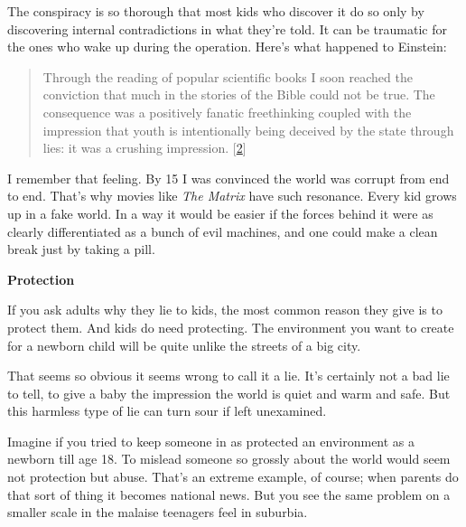 The conspiracy
                  is so thorough that most kids who discover it do so only by
                  discovering internal contradictions in what they're told. It
                  can be traumatic for the ones who wake up during the
                  operation. Here's what happened to Einstein:
                  \begin{quote}

                    Through the reading of popular scientific books I soon
                    reached the conviction that much in the stories of the Bible
                    could not be true. The consequence was a positively fanatic
                    freethinking coupled with the impression that youth is
                    intentionally being deceived by the state through lies: it
                    was a crushing impression.
                    [\href{\#f2n}{2}]
                  
\end{quote}

                  I remember that feeling. By 15 I was convinced the world was
                  corrupt from end to end. That's why movies like
                  \emph{The Matrix} have such resonance. Every kid grows up in a
                  fake world. In a way it would be easier if the forces behind
                  it were as clearly differentiated as a bunch of evil machines,
                  and one could make a clean break just by taking a pill.


                  \textbf{Protection}

If you ask adults why they lie to
                  kids, the most common reason they give is to protect them. And
                  kids do need protecting. The environment you want to create
                  for a newborn child will be quite unlike the streets of a big
                  city.

That seems so obvious it seems wrong to call
                  it a lie. It's certainly not a bad lie to tell, to give a baby
                  the impression the world is quiet and warm and safe. But this
                  harmless type of lie can turn sour if left unexamined.

Imagine
                  if you tried to keep someone in as protected an environment as
                  a newborn till age 18. To mislead someone so grossly about the
                  world would seem not protection but abuse. That's an extreme
                  example, of course; when parents do that sort of thing it
                  becomes national news. But you see the same problem on a
                  smaller scale in the malaise teenagers feel in suburbia.

